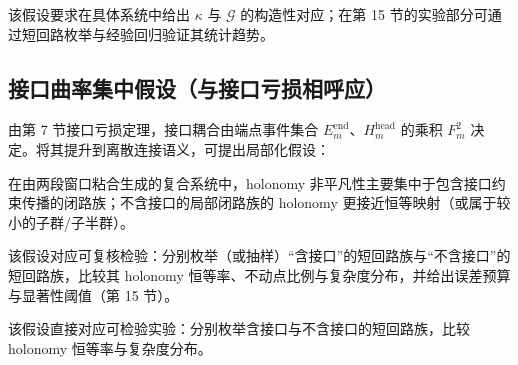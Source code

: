 该假设要求在具体系统中给出 $\kappa$ 与 $\mathcal G$ 的构造性对应；在第 15 节的实验部分可通过短回路枚举与经验回归验证其统计趋势。

\subsection{接口曲率集中假设（与接口亏损相呼应）}

由第 7 节接口亏损定理，接口耦合由端点事件集合 $E_m^{\mathrm{end}}$、$H_m^{\mathrm{head}}$ 的乘积 $F_m^2$ 决定。将其提升到离散连接语义，可提出局部化假设：

\begin{assumption}[接口曲率集中]\label{ass:curvature_concentration}
\InterfaceTag 在由两段窗口粘合生成的复合系统中，holonomy 非平凡性主要集中于包含接口约束传播的闭路族；不含接口的局部闭路族的 holonomy 更接近恒等映射（或属于较小的子群/子半群）。

\AuditTag 该假设对应可复核检验：分别枚举（或抽样）“含接口”的短回路族与“不含接口”的短回路族，比较其 holonomy 恒等率、不动点比例与复杂度分布，并给出误差预算与显著性阈值（第 15 节）。
\end{assumption}

该假设直接对应可检验实验：分别枚举含接口与不含接口的短回路族，比较 holonomy 恒等率与复杂度分布。
